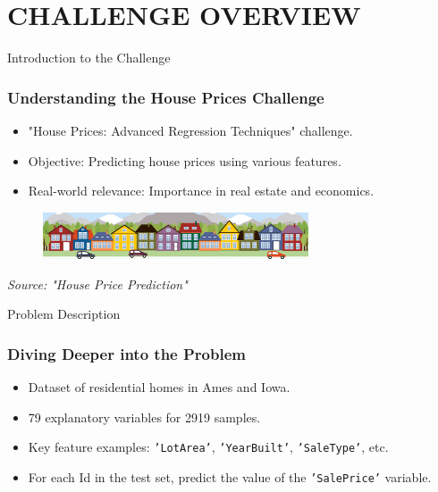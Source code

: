\section{CHALLENGE OVERVIEW}
\label{challenge_overview_section}


\begin{frame}{Introduction to the Challenge}
    \frametitle{Understanding the House Prices Challenge}
    \begin{itemize}
        \item "House Prices: Advanced Regression Techniques" challenge.
        \item Objective: Predicting house prices using various features.
        \item Real-world relevance: Importance in real estate and economics.      
    \end{itemize}
    \vspace{1cm}
    \begin{figure}
        \includegraphics[width=0.7\textwidth]{figures/housesbanner.png} %
    \end{figure}
    \vspace{0.5cm}
    \center
    \tiny
    \textit{Source: "House Price Prediction" \cite{kaggle_house_price_prediction}}
\end{frame}

\begin{frame}{Problem Description}
    \frametitle{Diving Deeper into the Problem}
    \begin{itemize}
        \item Dataset of residential homes in Ames and Iowa.
        \item 79 explanatory variables for 2919 samples.
        \item Key feature examples: \texttt{'LotArea'}, \texttt{'YearBuilt'}, \texttt{'SaleType'}, etc.
        \item For each Id in the test set, predict the value of the \texttt{'SalePrice'} variable.
    \end{itemize}
\end{frame}

